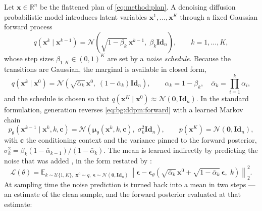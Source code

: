 \documentclass[headsepline,footsepline,footinclude=false,oneside,fontsize=11pt,paper=a4,listof=totoc,bibliography=totoc]{scrbook}
\theoremstyle{definition}
\theoremstyle{plain}
\theoremstyle{remark}
\newcommand{\vect}[1]{\boldsymbol{#1}}
\newcommand{\Id}[1]{\textbf{Id}_{#1}}
\newcommand{\R}{\mathbb{R}}                    %
\newcommand{\E}{\mathbb{E}}                    %
\newcommand{\Unif}{\mathcal{U}}                %
\newcommand{\Normal}{\mathcal{N}}              %
\newcommand{\nfe}{K}                           %
\begin{document}
Let $\vect{x} \in \R^{n}$ be the flattened plan of \eqref{eq:method:plan}. A denoising diffusion probabilistic model
\parencite{sohl2015deep,ho2020denoising} introduces latent variables
$\vect{x}^{1},\dots,\vect{x}^{\nfe}$ through a fixed Gaussian forward process
\begin{equation}\label{eq:bg:ddpm:forward}
  q\!\left(\vect{x}^{k} \mid \vect{x}^{k-1}\right)
  = \Normal\!\left(\sqrt{1-\beta_{k}}\,\vect{x}^{k-1},\; \beta_{k}\Id{n}\right),
  \qquad k = 1,\dots,\nfe ,
\end{equation}
whose step sizes $\beta_{1:\nfe} \in (0,1)^{\nfe}$ are set by a \emph{noise schedule}. Because
the transitions are Gaussian, the marginal is available in closed form,
\begin{equation}\label{eq:bg:ddpm:marginal}
  q\!\left(\vect{x}^{k} \mid \vect{x}^{0}\right)
  = \Normal\!\left(\sqrt{\bar{\alpha}_{k}}\,\vect{x}^{0},\;(1-\bar{\alpha}_{k})\Id{n}\right),
  \qquad
  \alpha_{k} = 1-\beta_{k}, \quad \bar{\alpha}_{k} = \prod_{i=1}^{k}\alpha_{i},
\end{equation}
and the schedule is chosen so that $q(\vect{x}^{\nfe}\mid\vect{x}^{0}) \approx \Normal(\vect{0},\Id{n})$.
In the standard formulation, generation reverses \eqref{eq:bg:ddpm:forward} with a learned Markov chain
\begin{equation}\label{eq:bg:ddpm:reverse}
  p_{\theta}\!\left(\vect{x}^{k-1}\mid\vect{x}^{k},k,\vect{c}\right)
  = \Normal\!\left(\vect{\mu}_{\theta}\!\left(\vect{x}^{k},k,\vect{c}\right),\;\sigma_{k}^{2}\Id{n}\right),
  \qquad p(\vect{x}^{\nfe}) = \Normal(\vect{0},\Id{n}),
\end{equation}
with $\vect{c}$ the conditioning context and the variance pinned to the forward posterior,
$\sigma_{k}^{2} = \beta_{k}(1-\bar{\alpha}_{k-1})/(1-\bar{\alpha}_{k})$. The mean is learned
indirectly by predicting the noise that was added \parencite{ho2020denoising}, in the form
restated by \parencite[Sec.~4]{romer2025diffusion}:
\begin{equation}\label{eq:bg:ddpm:loss}
  \mathcal{L}(\theta)
  = \E_{k \sim \Unif\{1,\nfe\},\; \vect{x}^{0}\sim q,\; \vect{\epsilon}\sim\Normal(\vect{0},\Id{n})}
    \left\|\vect{\epsilon} - \vect{\epsilon}_{\theta}\!\left(
      \sqrt{\bar{\alpha}_{k}}\,\vect{x}^{0} + \sqrt{1-\bar{\alpha}_{k}}\,\vect{\epsilon},\;k\right)\right\|_{2}^{2}.
\end{equation}
At sampling time the noise prediction is turned back into a mean in two steps --- an estimate of
the clean sample, and the forward posterior evaluated at that estimate:
\end{document}
